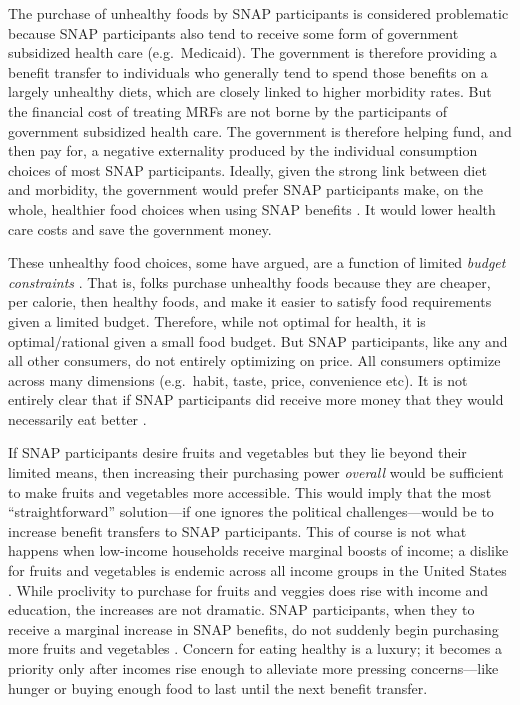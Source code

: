 \documentclass[11pt,letterpaper,]{book}
\begin{document}
The purchase of unhealthy foods by SNAP participants is considered
problematic because SNAP participants also tend to receive some form of
government subsidized health care (e.g.~Medicaid). The government is
therefore providing a benefit transfer to individuals who generally tend
to spend those benefits on a largely unhealthy diets, which are closely
linked to higher morbidity rates. But the financial cost of treating
MRFs are not borne by the participants of government subsidized health
care. The government is therefore helping fund, and then pay for, a
negative externality produced by the individual consumption choices of
most SNAP participants. Ideally, given the strong link between diet and
morbidity, the government would prefer SNAP participants make, on the
whole, healthier food choices when using SNAP benefits
\citep{richards_rewarding_2013, brownell_kd_supplemental_2011, guthrie_usda_2007}.
It would lower health care costs and save the government money.

These unhealthy food choices, some have argued, are a function of
limited \emph{budget constraints} \citep{andreyeva_impact_2010}. That
is, folks purchase unhealthy foods because they are cheaper, per
calorie, then healthy foods, and make it easier to satisfy food
requirements given a limited budget. Therefore, while not optimal for
health, it is optimal/rational given a small food budget. But SNAP
participants, like any and all other consumers, do not entirely
optimizing on price. All consumers optimize across many dimensions
(e.g.~habit, taste, price, convenience etc). It is not entirely clear
that if SNAP participants did receive more money that they would
necessarily eat better \citep{an_effectiveness_2013}.

If SNAP participants desire fruits and vegetables but they lie beyond
their limited means, then increasing their purchasing power
\emph{overall} would be sufficient to make fruits and vegetables more
accessible. This would imply that the most ``straightforward''
solution---if one ignores the political challenges---would be to
increase benefit transfers to SNAP participants. This of course is not
what happens when low-income households receive marginal boosts of
income; a dislike for fruits and vegetables is endemic across all income
groups in the United States \citep{frazao_americas_1999}. While
proclivity to purchase for fruits and veggies does rise with income and
education, the increases are not dramatic. SNAP participants, when they
to receive a marginal increase in SNAP benefits, do not suddenly begin
purchasing more fruits and vegetables \citep{hayden_income_2003}.
Concern for eating healthy is a luxury; it becomes a priority only after
incomes rise enough to alleviate more pressing concerns---like hunger or
buying enough food to last until the next benefit transfer.
\end{document}
